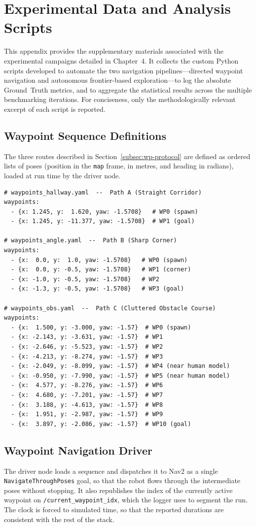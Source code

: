 \chapter{Experimental Data and Analysis Scripts}
\label{app:results_scripts}
This appendix provides the supplementary materials associated with the experimental campaigns detailed in Chapter~4. It collects the custom Python scripts developed to automate the two navigation pipelines---directed waypoint navigation and autonomous frontier-based exploration---to log the absolute Ground~Truth metrics, and to aggregate the statistical results across the multiple benchmarking iterations. For conciseness, only the methodologically relevant excerpt of each script is reported.

\section{Waypoint Sequence Definitions}
The three routes described in Section~\ref{subsec:wp-protocol} are defined as ordered lists of poses (position in the \texttt{map} frame, in metres, and heading in radians), loaded at run time by the driver node.

\begin{lstlisting}
# waypoints_hallway.yaml  --  Path A (Straight Corridor)
waypoints:
  - {x: 1.245, y:  1.620, yaw: -1.5708}   # WP0 (spawn)
  - {x: 1.245, y: -11.377, yaw: -1.5708}  # WP1 (goal)

# waypoints_angle.yaml  --  Path B (Sharp Corner)
waypoints:
  - {x:  0.0, y:  1.0, yaw: -1.5708}   # WP0 (spawn)
  - {x:  0.0, y: -0.5, yaw: -1.5708}   # WP1 (corner)
  - {x: -1.0, y: -0.5, yaw: -1.5708}   # WP2
  - {x: -1.3, y: -0.5, yaw: -1.5708}   # WP3 (goal)

# waypoints_obs.yaml  --  Path C (Cluttered Obstacle Course)
waypoints:
  - {x:  1.500, y: -3.000, yaw: -1.57}  # WP0 (spawn)
  - {x: -2.143, y: -3.631, yaw: -1.57}  # WP1
  - {x: -2.646, y: -5.523, yaw: -1.57}  # WP2
  - {x: -4.213, y: -8.274, yaw: -1.57}  # WP3
  - {x: -2.049, y: -8.099, yaw: -1.57}  # WP4 (near human model)
  - {x: -0.950, y: -7.990, yaw: -1.57}  # WP5 (near human model)
  - {x:  4.577, y: -8.276, yaw: -1.57}  # WP6
  - {x:  4.680, y: -7.201, yaw: -1.57}  # WP7
  - {x:  3.188, y: -4.613, yaw: -1.57}  # WP8
  - {x:  1.951, y: -2.987, yaw: -1.57}  # WP9
  - {x:  3.897, y: -2.086, yaw: -1.57}  # WP10 (goal)
\end{lstlisting}

\section{Waypoint Navigation Driver}
The driver node loads a sequence and dispatches it to Nav2 as a single \texttt{NavigateThroughPoses} goal, so that the robot flows through the intermediate poses without stopping. It also republishes the index of the currently active waypoint on \texttt{/current\_waypoint\_idx}, which the logger uses to segment the run. The clock is forced to simulated time, so that the reported durations are consistent with the rest of the stack.

